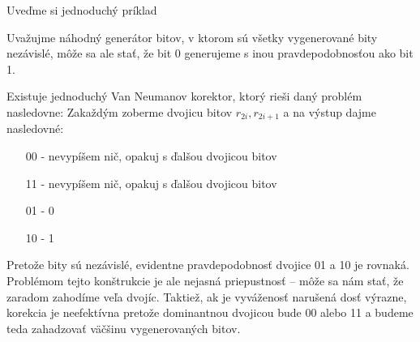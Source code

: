 Uveďme si jednoduchý príklad
\begin{priklad}
  Uvažujme náhodný generátor bitov, v ktorom sú všetky vygenerované bity
  nezávislé, môže sa ale stať, že bit 0 generujeme s inou pravdepodobnosťou
  ako bit 1.

  Existuje jednoduchý Van Neumanov korektor, ktorý rieši
  daný problém nasledovne: Zakaždým zoberme dvojicu bitov $r_{2i},r_{2i+1}$
  a na výstup dajme nasledovné:
  \begin{itemize}
    \item[00] - nevypíšem nič, opakuj s ďalšou dvojicou bitov
    \item[11] - nevypíšem nič, opakuj s ďalšou dvojicou bitov
    \item[01] - 0
    \item[10] - 1
  \end{itemize}
  Pretože bity sú nezávislé, evidentne pravdepodobnosť dvojice 01 a 10 je
  rovnaká. Problémom tejto konštrukcie je ale nejasná priepustnosť --
  môže sa nám stať, že zaradom zahodíme veľa dvojíc. Taktiež, ak je
  vyváženosť narušená dosť výrazne, korekcia je neefektívna pretože
  dominantnou dvojicou bude 00 alebo 11 a budeme teda zahadzovať väčšinu
  vygenerovaných bitov.
\end{priklad}

